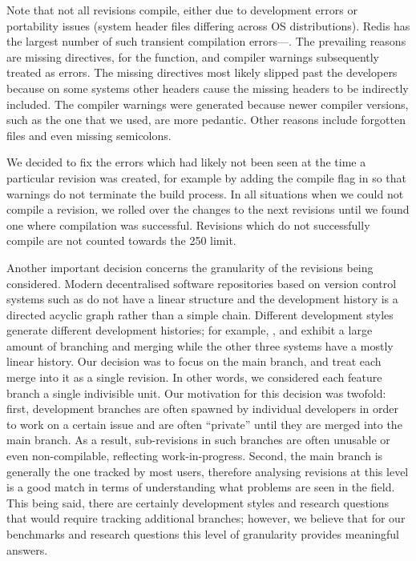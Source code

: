Note that not all revisions compile, either due to development errors
or portability issues (\eg system header files differing across OS
distributions).
Redis has the largest number of such transient compilation
errors---\redisTransientCompErrs.  The prevailing reasons are missing
 directives, \eg {} for the  function,
and compiler warnings subsequently treated as errors.  The missing
 directives most likely slipped past the developers because on
some systems other  headers cause the missing headers to be
indirectly included. The compiler warnings were generated because newer
compiler versions, such as the one that we used, are more pedantic.  Other
reasons include forgotten files and even missing semicolons.

We decided to fix the errors which had likely not been seen at the time a
particular revision was created, for example by adding the compile flag
 in \binutils so that warnings do not terminate the build
process. In all situations when we could not compile a revision, we rolled over
the changes to the next revisions until we found one where compilation was
successful.  Revisions which do not successfully compile are not counted
towards the 250 limit.

Another important decision concerns the granularity of the revisions
being considered.  Modern decentralised software repositories based on
version control systems such as \git do not have a linear structure
and the development history is a directed acyclic graph rather than a
simple chain.  Different development styles generate different
development histories; for example, \git, \redis and \zeromq exhibit a
large amount of branching and merging while the other three systems
have a mostly linear history.  Our decision was to focus on the main branch,
and treat each merge into it as a single revision. In other words, we
considered each feature branch a single indivisible unit.  Our
motivation for this decision was twofold: first, development branches
are often spawned by individual developers in order to work on a
certain issue and are often ``private'' until they are merged into the
main branch.  As a result, sub-revisions in such branches are often
unusable or even non-compilable, reflecting work-in-progress.  Second,
the main branch is generally the one tracked by most users, therefore
analysing revisions at this level is a good match in terms of
understanding what problems are seen in the field.  This being said,
there are certainly development styles and research questions that would
require tracking additional branches; however, we believe that for our
benchmarks and research questions this level of granularity provides meaningful
answers.

